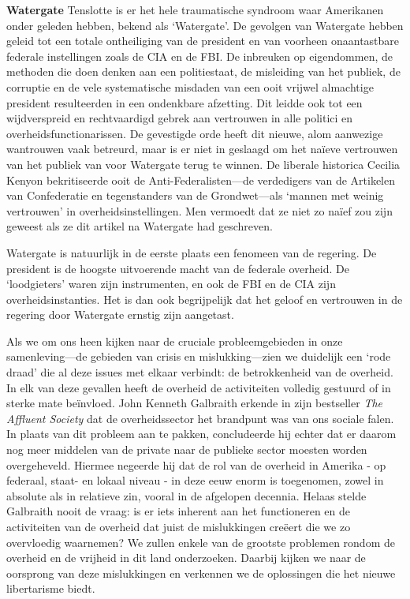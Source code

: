 \documentclass[
  a5paper,
  smalldemyvopaper,10pt,twoside,onecolumn,openright,extrafontsizes,hidelinks]{memoir}
\begin{document}
\textbf{Watergate} Tenslotte is er het hele traumatische syndroom waar
Amerikanen onder geleden hebben, bekend als `Watergate'. De gevolgen van
Watergate hebben geleid tot een totale ontheiliging van de president en
van voorheen onaantastbare federale instellingen zoals de CIA en de FBI.
De inbreuken op eigendommen, de methoden die doen denken aan een
politiestaat, de misleiding van het publiek, de corruptie en de vele
systematische misdaden van een ooit vrijwel almachtige president
resulteerden in een ondenkbare afzetting. Dit leidde ook tot een
wijdverspreid en rechtvaardigd gebrek aan vertrouwen in alle politici en
overheidsfunctionarissen. De gevestigde orde heeft dit nieuwe, alom
aanwezige wantrouwen vaak betreurd, maar is er niet in geslaagd om het
naïeve vertrouwen van het publiek van voor Watergate terug te winnen. De
liberale historica Cecilia Kenyon bekritiseerde ooit de
Anti-Federalisten---de verdedigers van de Artikelen van Confederatie en
tegenstanders van de Grondwet---als `mannen met weinig vertrouwen' in
overheidsinstellingen. Men vermoedt dat ze niet zo naïef zou zijn
geweest als ze dit artikel na Watergate had geschreven.

Watergate is natuurlijk in de eerste plaats een fenomeen van de
regering. De president is de hoogste uitvoerende macht van de federale
overheid. De `loodgieters' waren zijn instrumenten, en ook de FBI en de
CIA zijn overheidsinstanties. Het is dan ook begrijpelijk dat het geloof
en vertrouwen in de regering door Watergate ernstig zijn aangetast.

Als we om ons heen kijken naar de cruciale probleemgebieden in onze
samenleving---de gebieden van crisis en mislukking---zien we duidelijk
een `rode draad' die al deze issues met elkaar verbindt: de
betrokkenheid van de overheid. In elk van deze gevallen heeft de
overheid de activiteiten volledig gestuurd of in sterke mate beïnvloed.
John Kenneth Galbraith erkende in zijn bestseller \emph{The Affluent
Society} dat de overheidssector het brandpunt was van ons sociale falen.
In plaats van dit probleem aan te pakken, concludeerde hij echter dat er
daarom nog meer middelen van de private naar de publieke sector moesten
worden overgeheveld. Hiermee negeerde hij dat de rol van de overheid in
Amerika - op federaal, staat- en lokaal niveau - in deze eeuw enorm is
toegenomen, zowel in absolute als in relatieve zin, vooral in de
afgelopen decennia. Helaas stelde Galbraith nooit de vraag: is er iets
inherent aan het functioneren en de activiteiten van de overheid dat
juist de mislukkingen creëert die we zo overvloedig waarnemen? We zullen
enkele van de grootste problemen rondom de overheid en de vrijheid in
dit land onderzoeken. Daarbij kijken we naar de oorsprong van deze
mislukkingen en verkennen we de oplossingen die het nieuwe libertarisme
biedt.
\end{document}
